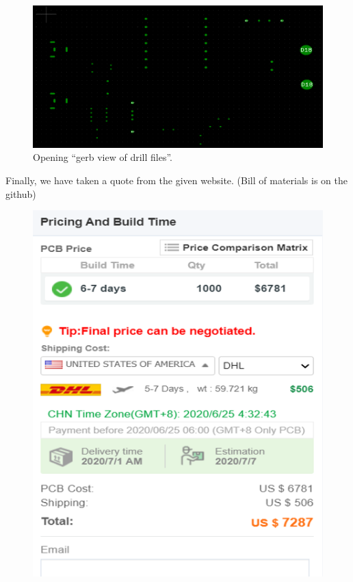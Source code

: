 \documentclass{article}
\begin{document}
\begin{figure}[H]
    \centering
    \includegraphics[scale=0.9]{PCB8.png}
    \caption{Opening “gerb view of drill files”. }
    \label{fig:my_label}
\end{figure}
Finally, we have taken a quote from the given website. (Bill of materials is on the github)


\begin{figure}[H]
    \centering
    \includegraphics[scale=0.9]{PCB9.png}
    \label{fig:my_label}
\end{figure}
\end{document}

